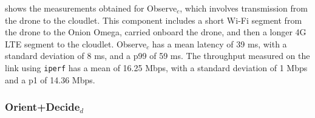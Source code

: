  shows the measurements obtained for
Observe$_c$, which involves transmission from the drone to the cloudlet. This
component includes a short Wi-Fi segment from the drone to the Onion Omega,
carried onboard the drone, and then a longer 4G LTE segment to the cloudlet.
Observe$_c$ has a mean latency of 39 ms, with a standard deviation of 8 ms, and
a p99 of 59 ms. The throughput measured on the link using \texttt{iperf} has a
mean of 16.25 Mbps, with a standard deviation of 1 Mbps and a p1 of 14.36 Mbps.

\subsubsection{\texorpdfstring{Orient+Decide$_d$}{Orient+Decide\_d}}
\label{sec:onion-orient-decide-d}

